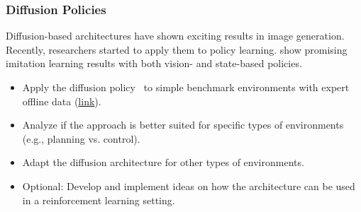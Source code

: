 \documentclass[a4paper]{article}
\begin{document}
\subsubsection{Diffusion Policies}
Diffusion-based architectures have shown exciting results in image generation.
Recently, researchers started to apply them to policy learning. 
\citet{Chi2023DiffusionPolicy} show promising imitation learning results with both vision- and state-based policies.
\begin{itemize}
  \item Apply the diffusion policy~\cite{Chi2023DiffusionPolicy} to simple benchmark environments with expert offline data (\href{https://github.com/Farama-Foundation/d4rl/wiki/Tasks}{link}).
  \item Analyze if the approach is better suited for specific types of environments (e.g., planning vs. control).
  \item Adapt the diffusion architecture for other types of environments.
  \item Optional: Develop and implement ideas on how the architecture can be used in a reinforcement learning setting. 
\end{itemize}



\end{document}
